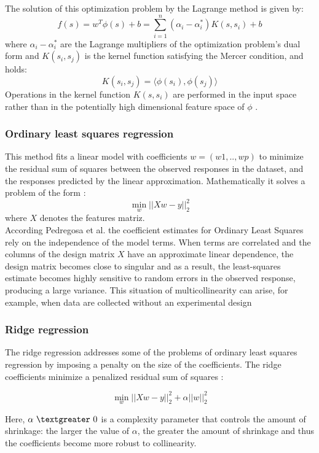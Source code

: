 \documentclass[review]{elsarticle}
\begin{document}
The solution of this optimization problem by the Lagrange method is given by:\\
$$ f(s) = w^T \phi (s) + b = \sum_{i=1}^{n} (\alpha_i - \alpha_i^*) K (s,s_i) + b $$ 
where $\alpha_i - \alpha_i^*$  are the Lagrange multipliers of the optimization problem’s dual form and $K(s_i,s_j )$ is the kernel function satisfying the Mercer condition, and holds:
$$K(s_i,s_j ) = \big \langle  \phi(s_i) , \phi(s_j)  \big \rangle $$
Operations in the kernel function $K(s,s_i )$ are performed in the input space rather than in the potentially high dimensional feature space of $\phi$ \citep{Alonso2013}.

\subsubsection{Ordinary least squares regression}
This method fits a linear model with coefficients $w = (w1,..,wp)$ to minimize the residual sum of squares between the observed responses in the dataset, and the responses predicted by the linear approximation. Mathematically it solves a problem of the form \citep{ scikit-learn2011}:
$$\min_{w} \Bigr| \Bigr| Xw - y \Bigr| \Bigr|_2^2  $$
where $X$ denotes the features matriz. \\
According Pedregosa et al. \citep{ scikitlearn2011}  the coefficient estimates for Ordinary Least Squares rely on the independence of the model terms. When terms are correlated and the columns of the design matrix $X$ have an approximate linear dependence, the design matrix becomes close to singular and as a result, the least-squares estimate becomes highly sensitive to random errors in the observed response, producing a large variance. This situation of multicollinearity can arise, for example, when data are collected without an experimental design

\subsubsection{Ridge regression}
The ridge regression addresses some of the problems of ordinary least squares regression by imposing a penalty on the size of the coefficients. The ridge coefficients minimize a penalized residual sum of squares  \citep{scikitlearn2011}:

$$\min_{w} { \Bigr| \Bigr| Xw - y \Bigr| \Bigr|_2^2  + \alpha \Bigr| \Bigr| w \Bigr| \Bigr|_2^2 } $$

Here, $\alpha \ \textgreater \  0$ is a complexity parameter that controls the amount of shrinkage: the larger the value of $\alpha$, the greater the amount of shrinkage and thus the coefficients become more robust to collinearity.
\end{document}
